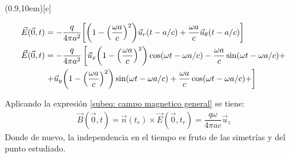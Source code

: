 \documentclass[11 pt]{article}
\begin{document}
\begin{center}
    \framebox(0.9\textwidth,10em)[c]{\begin{minipage}{0.8\textwidth}
            \begin{align}
            \vec{E}(\vec{0}, t) &= -\dfrac{q}{4\pi a^2}\qty[\qty(1-\qty(\dfrac{\omega a}{c})^2)\vec{u}_r (t-a/c)+ \dfrac{\omega a}{c}\vec{u}_\theta (t-a/c)]  \\
            \vec{E}(\vec{0}, t)&= -\dfrac{q}{4\pi a^2}\left[\vec{u}_x\qty(1-\qty(\dfrac{\omega a}{c})^2)\cos(\omega t - \omega a/c) - \dfrac{\omega a}{c}\sin(\omega t - \omega a/c) + \nonumber\right.\\
            &\left.+\vec{u}_y\qty(1-\qty(\dfrac{\omega a}{c})^2)\sin(\omega t - \omega a/c) + \dfrac{\omega a}{c}\cos(\omega t - \omega a/c) + \right]
        \end{align}    
    \end{minipage}}
\end{center}

    
Aplicando la expresión \eqref{subeq: campo magnetico general} se tiene: 
\begin{align}
    \boxed{\vec{B}(\vec{0}, t) = \vec{n}(t_r)\times\vec{E}(\vec{0},t_r) = \dfrac{q\omega}{4\pi ac}\vec{u}_z} 
\end{align}
Donde de nuevo, la independencia en el tiempo es fruto de las simetrías y del punto estudiado. 
\end{document}
